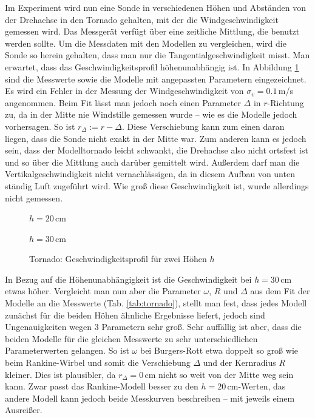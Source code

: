 \documentclass[12pt,a4paper,headinclude,bibtotoc]{scrartcl}
\begin{document}
Im Experiment wird nun eine Sonde in verschiedenen Höhen und Abständen von der Drehachse in den Tornado gehalten, mit der die Windgeschwindigkeit gemessen wird.
Das Messgerät verfügt über eine zeitliche Mittlung, die benutzt werden sollte.
Um die Messdaten mit den Modellen zu vergleichen, wird die Sonde so herein gehalten, dass man nur die Tangentialgeschwindigkeit misst.
Man erwartet, dass das Geschwindigkeitsprofil höhenunabhängig ist.
In Abbildung \ref{fig:tornado} sind die Messwerte sowie die Modelle mit angepassten Parametern eingezeichnet.
Es wird ein Fehler in der Messung der Windgeschwindigkeit von $\sigma_v = 0.1\,$m/s angenommen.
Beim Fit lässt man jedoch noch einen Parameter $\Delta$ in $r$-Richtung zu, da in der Mitte nie Windstille gemessen wurde -- wie es die Modelle jedoch vorhersagen.
So ist $r_\Delta:=r-\Delta$.
Diese Verschiebung kann zum einen daran liegen, dass die Sonde nicht exakt in der Mitte war.
Zum anderen kann es jedoch sein, dass der Modelltornado leicht schwankt, die Drehachse also nicht ortsfest ist und so über die Mittlung auch darüber gemittelt wird.
Außerdem darf man die Vertikalgeschwindigkeit nicht vernachlässigen, da in diesem Aufbau von unten ständig Luft zugeführt wird.
Wie groß diese Geschwindigkeit ist, wurde allerdings nicht gemessen.
 \begin{figure}[!htb]
	\begin{minipage}{0.5\textwidth}	
		\resizebox{\textwidth}{!}{   		
   		}
   		\caption*{\footnotesize{$h=20\,$cm}}
   \end{minipage}   
   \begin{minipage}{0.5\textwidth}   		
		\resizebox{\textwidth}{!}{   		
   		}
   		\caption*{\footnotesize{$h=30\,$cm}}
   \end{minipage}
   \caption{Tornado: Geschwindigkeitsprofil für zwei Höhen $h$}
   \label{fig:tornado}
 \end{figure}
 
 In Bezug auf die Höhenunabhängigkeit ist die Geschwindigkeit bei $h=30\,$cm etwas höher.
 Vergleicht man nun aber die Parameter $\omega$, $R$ und $\Delta$ aus dem Fit der Modelle an die Messwerte (Tab. \ref{tab:tornado}), stellt man fest, dass jedes Modell zunächst für die beiden Höhen ähnliche Ergebnisse liefert, jedoch sind Ungenauigkeiten wegen 3 Parametern sehr groß.
Sehr auffällig ist aber, dass die beiden Modelle für die gleichen Messwerte zu sehr unterschiedlichen Parameterwerten gelangen.
So ist $\omega$ bei Burgers-Rott etwa doppelt so groß wie beim Rankine-Wirbel und somit die Verschiebung $\Delta$ und der Kernradius $R$ kleiner.
Dies ist plausibler, da $r_\Delta=0\,$cm nicht so weit von der Mitte weg sein kann.
Zwar passt das Rankine-Modell besser zu den $h=20\,$cm-Werten, das andere Modell kann jedoch beide Messkurven beschreiben -- mit jeweils einem Ausreißer.
 
\end{document}
